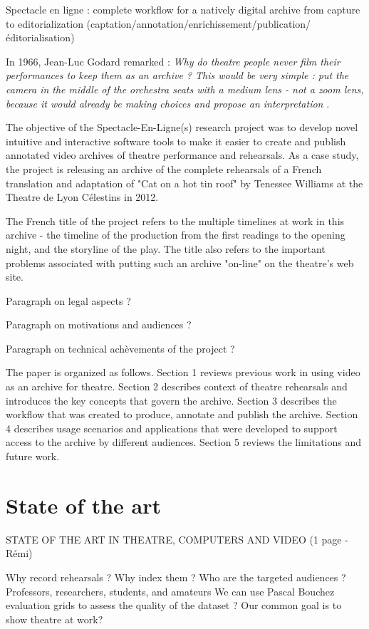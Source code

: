 \documentclass[conference]{IEEEtran}
\begin{document}
Spectacle en ligne : complete workflow for a natively digital archive from capture to editorialization
(captation/annotation/enrichissement/publication/éditorialisation)

In 1966, Jean-Luc Godard remarked : {\em Why do theatre people never film their performances to keep  them as an archive ? This would be very simple : put the camera in the middle of the orchestra seats with a medium lens -  not  a zoom lens, because it would already be making choices and propose an interpretation} \cite{Godard66}.

The objective of the Spectacle-En-Ligne(s) research project was to develop novel intuitive and interactive software tools to make it easier to 
create and publish annotated video archives of theatre performance and rehearsals. As a case study, the project is releasing an archive of 
the complete rehearsals of a French translation and adaptation of "Cat on a hot tin roof" by Tenessee Williams at the Theatre de Lyon Célestins
in 2012. 

The French title of the project refers to the multiple timelines at work in this archive   - the timeline of the production from the first readings to the opening night, and the storyline of the play. The title also refers to the important problems associated with putting such an archive "on-line" on the theatre's web site.

Paragraph on legal aspects ? 

Paragraph on motivations and audiences ? 

Paragraph on technical achèvements of the project ?

The paper is organized as follows. Section 1 reviews previous work in using video as an archive for theatre. Section 2 describes
context of theatre rehearsals and introduces the key concepts that govern the archive. Section 3 describes the workflow that was
created to produce, annotate and publish the archive. Section 4 describes usage scenarios and applications that were developed
to support access to the archive by different audiences. Section 5 reviews the limitations and future work.



\section{State of the art}
STATE OF THE ART IN THEATRE, COMPUTERS AND VIDEO (1 page - Rémi)

Why record rehearsals ?
Why index them ?
Who are the targeted audiences ? Professors, researchers, students, and amateurs
We can use Pascal Bouchez evaluation grids to assess the quality of the dataset ?
Our common goal is to show theatre at work?
\end{document}
